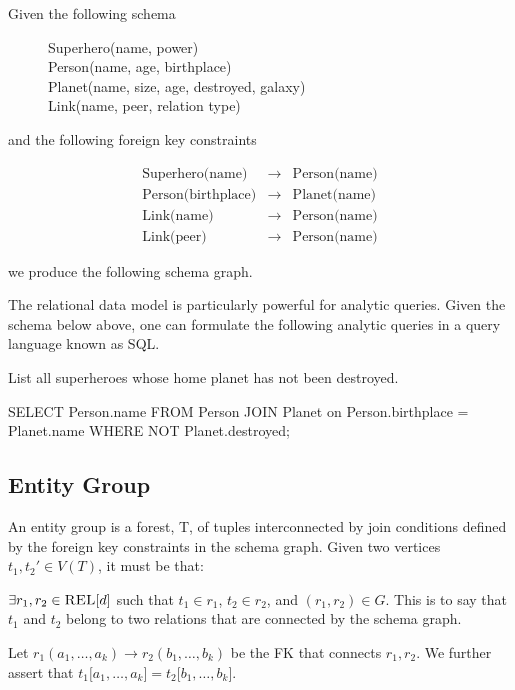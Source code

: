 		\begin{ex}
			Given the following schema
			
			\begin{figure}[!ht]
				\centering
				
				Superhero(name, power) \\
				Person(name, age, birthplace) \\
				Planet(name, size, age, destroyed, galaxy) \\
				Link(name, peer, relation type) \\
			\end{figure}
			
			and the following foreign key constraints
			
			\begin{eqnarray*}
				\textrm{Superhero(name)} &\rightarrow& \textrm{Person(name)} \\
				\textrm{Person(birthplace)} &\rightarrow& \textrm{Planet(name)} \\
				\textrm{Link(name)} &\rightarrow& \textrm{Person(name)} \\
				\textrm{Link(peer)} &\rightarrow& \textrm{Person(name)}
			\end{eqnarray*}
			
			we produce the following schema graph.
			
			
			The relational data model is particularly powerful for analytic queries.  Given the schema below above, one can formulate the following analytic queries in a query language known as SQL.
			
			List all superheroes whose home planet has not been destroyed.
			
			SELECT Person.name FROM Person JOIN Planet on Person.birthplace = Planet.name WHERE NOT Planet.destroyed;
		\end{ex}
		
	\subsection{Entity Group}
		\begin{defn}
			An entity group is a forest, T,  of tuples interconnected by join conditions defined by the foreign key constraints in the schema graph.  Given two vertices $t_1, t_2'\in V\left(T\right)$, it must be that:

			$\exists r_1, r_2\in \textsc{REL}\lbrack d\rbrack$ such that $t_1 \in r_1$, $t_2\in r_2$, and $\left(r_1, r_2\right)\in G$.  This is to say that $t_1$ and $t_2$ belong to two relations that are connected by the schema graph.

			Let $r_1\left(a_1, \dotsc, a_k\right) \to r_2\left(b_1, \dotsc, b_k\right)$ be the FK that connects $r_1, r_2$.  We further assert that $t_1\lbrack a_1, \dotsc, a_k\rbrack = t_2\lbrack b_1, \dotsc, b_k\rbrack$.
		\end{defn}
		

